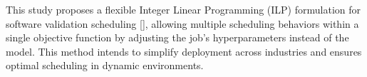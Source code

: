 \documentclass[12pt]{article}
\begin{document}





This study proposes a flexible Integer Linear Programming (ILP) formulation for software validation scheduling [], allowing multiple scheduling behaviors within a single objective function by adjusting the job's hyperparameters instead of the model. This method intends to simplify deployment across industries and ensures optimal scheduling in dynamic environments. %
\end{document}
